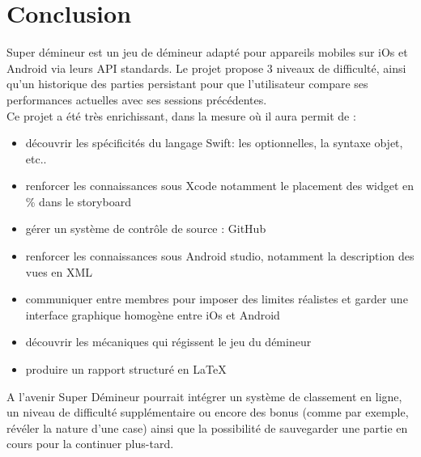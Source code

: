 \documentclass{article}
\begin{document}
\section{Conclusion}

Super démineur est un jeu de démineur adapté pour appareils mobiles sur iOs et Android via leurs API standards. Le projet propose 3 niveaux de difficulté, ainsi qu'un historique des parties persistant pour que l'utilisateur compare ses performances actuelles avec ses sessions précédentes.\\

Ce projet a été très enrichissant, dans la mesure où il aura permit de : 
\begin{itemize}
    \item découvrir les spécificités du langage Swift: les optionnelles, la syntaxe objet, etc..
    \item renforcer les connaissances sous Xcode notamment le placement des widget en \% dans le storyboard
    \item gérer un système de contrôle de source : GitHub 
    \item renforcer les connaissances sous Android studio, notamment la description des vues en XML
    \item communiquer entre membres pour imposer des limites réalistes et garder une interface graphique homogène entre iOs et Android
    \item découvrir les mécaniques qui régissent le jeu du démineur 
    \item produire un rapport structuré en \LaTeX \\
\end{itemize}

A l'avenir Super Démineur pourrait intégrer un système de classement en ligne, un niveau de difficulté supplémentaire ou encore des bonus (comme par exemple, révéler la nature d'une case) ainsi que la possibilité de sauvegarder une partie en cours pour la continuer plus-tard.


\newpage
\end{document}
